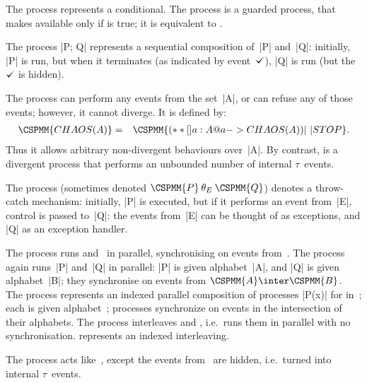The process  represents a conditional. 
The process  is a guarded process, that makes  available
only if  is true; it is equivalent to .

The process |P; Q| represents a sequential composition of~|P| and~|Q|:
initially, |P| is run, but when it terminates (as indicated by event~$\tick$),
|Q| is run (but the $\tick$ is hidden). 

The process  can perform any events from the set~|A|, or can
refuse any of those events; however, it cannot diverge.  It is defined by:
\begin{eqnarray*}
\CSPMM{CHAOS(A)} & = & \CSPMM{(**[] a:A @ a -> CHAOS(A)) |~| STOP}.
\end{eqnarray*}
Thus it allows arbitrary non-divergent behaviours over~|A|.  By contrast,
 is a divergent process that performs an unbounded number of
internal $\tau$~events.

The process \CSPM{P [|E|> Q} 
(sometimes denoted $\CSPMM{P} \mathbin{\theta_E} \CSPMM{Q}$) denotes a
  throw-catch mechanism: initially, |P| is executed, but if it performs an
  event from~|E|, control is passed to~|Q|: the events from~|E| can be thought
  of as exceptions, and |Q| as an exception handler.

The process  runs  and~ in parallel,
synchronising on events from~.  The process  again
runs~|P| and~|Q| in parallel: |P| is given alphabet~|A|, and |Q| is given
alphabet~|B|; they synchronise on events from $\CSPMM{A} \inter \CSPMM{B}$.
%
The process  represents an indexed parallel composition of processes |P(x)| for
 in~; each  is given alphabet~;
processes synchronize on events in the intersection of their alphabets.
The process  interleaves  and , i.e.\ runs them
in parallel with no synchronisation.   represents an
indexed interleaving.

The process  acts like~, except the events from~
are hidden, i.e.~turned into internal $\tau$~events.  
%

